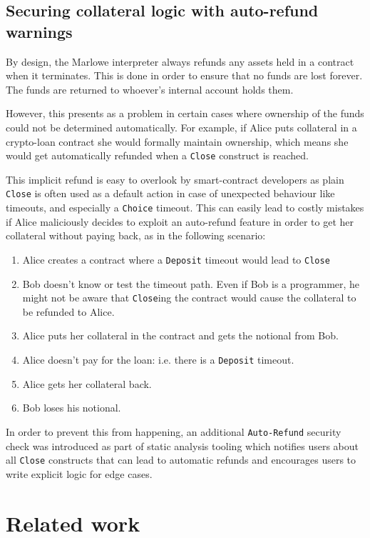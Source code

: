 \documentclass[runningheads]{llncs}
\begin{document}
\subsection{Securing collateral logic with auto-refund warnings}

By design, the Marlowe interpreter always refunds any assets held in a
contract when it terminates. This is done in order to ensure that
no funds are lost forever. The funds are returned to whoever's internal
account  holds them.

However, this presents as a problem in certain cases where ownership
of the funds could not be  determined automatically. For example, if
Alice puts collateral in a crypto-loan contract she would formally
maintain ownership, which means she would get automatically refunded
when a \texttt{Close} construct is reached.

This implicit refund is easy to overlook by smart-contract developers
as plain \texttt{Close} is often used as a default action in case of unexpected
behaviour like timeouts, and especially a \texttt{Choice} timeout. This can easily
lead to costly %
mistakes if  Alice maliciously decides to
exploit an auto-refund feature in order to get her collateral without
paying back, as in the following scenario:
\begin{enumerate}
\item Alice creates a contract where a \texttt{Deposit} timeout would lead to \texttt{Close} 
\item Bob doesn't know or test the timeout path. Even if Bob is a programmer,
he might not be aware that \texttt{Close}ing the contract would cause the collateral
to be refunded to Alice.
\item Alice puts her collateral in the contract and gets the notional from Bob.
\item Alice doesn't pay for the loan: i.e. there is a \texttt{Deposit} timeout. 
\item Alice gets her collateral back. 
\item Bob loses his notional. 
\end{enumerate}
In order to prevent this from happening, an additional \texttt{Auto-Refund}
security check was introduced as part of static analysis tooling which
notifies users about all \texttt{Close} constructs that can lead to automatic
refunds and encourages users to write explicit logic for edge cases.

\section{Related work}\label{related}
\end{document}
